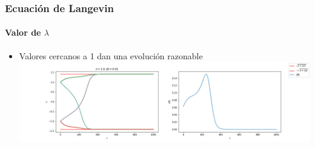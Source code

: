 \documentclass[11pt]{beamer}
\begin{document}
\begin{frame}
\frametitle{Ecuación de Langevin}
\framesubtitle{Valor de $\lambda$}
\begin{itemize}
	\item Valores cercanos a 1 dan una evolución razonable
	\includegraphics[width=\linewidth, trim= 0 0 0 -3cm]{Normal.png}
\end{itemize}
\end{frame}
\end{document}
